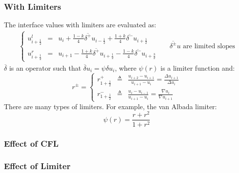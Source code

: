 \documentclass[11pt, a4paper]{article}
\begin{document}
\subsubsection{With Limiters}
The interface values with limiters are evaluated as:
\begin{equation}
    \begin{matrix}
        \left\{\begin{array}{lcl}
            u_{i+\frac{1}{2}}^l & = & u_i+\frac{1-k}{4}\overline{\delta^+} u_{i-\frac{1}{2}}+\frac{1+k}{4}\overline{\delta^-} u_{i+\frac{1}{2}} \\
            u_{i+\frac{1}{2}}^r & = & u_{i+1}-\frac{1+k}{4}\overline{\delta^+} u_{i+\frac{1}{2}}-\frac{1-k}{4}\overline{\delta^-} u_{i+\frac{3}{2}}
        \end{array}\right. && {\overline{\delta^\pm}} u\text{ are limited slopes}
    \end{matrix}
\end{equation}
$\overline{\delta}$ is an operator such that $\overline{\delta}u_i=\psi\delta u_i$, where $\psi\left(r\right)$ is a limiter function and:
\begin{equation}
    r^\pm=\left\{\begin{array}{ccc}
        r_{1+\frac{1}{2}}^+ & \triangleq & \displaystyle\frac{u_{i+2}-u_{i+1}}{u_{i+1}-u_i}=\frac{\Delta u_{i+1}}{\Delta u_i} \\
        r_{1+\frac{1}{2}}^- & \triangleq & \displaystyle\frac{u_{i}-u_{i-1}}{u_{i+1}-u_i}=\frac{\nabla u_{i}}{\nabla u_{i+1}}
    \end{array}\right.
\end{equation}
There are many types of limiters. For example, the van Albada limiter:
\begin{equation}
    \psi\left(r\right)=\frac{r+r^2}{1+r^2}
\end{equation}

\subsubsection{Effect of CFL}

\subsubsection{Effect of Limiter}

\newpage
\end{document}
